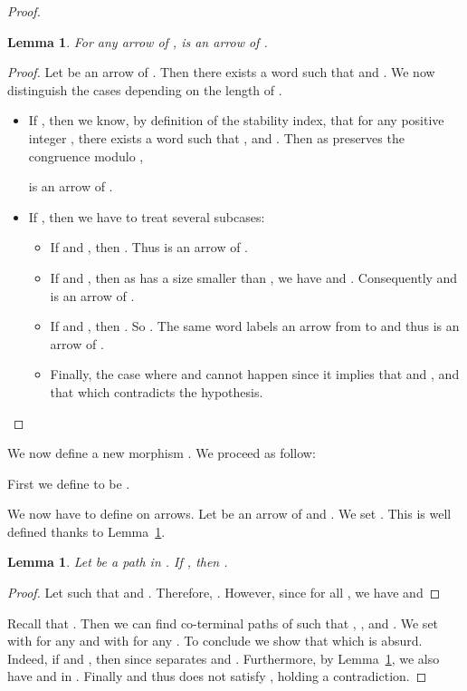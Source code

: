 \documentclass[submission,hidelink]{dmtcs-episciences}
\newtheorem{lemma}[theorem]{Lemma}
\newenvironment{itemize2}[1]{\begin{list}{--}{\setlength{\leftmargin}{0cm}}#1}{\end{list}}
\begin{document}
\begin{proof}
		\begin{lemma}\label{lemma:theta_arrow}
		For any arrow  of ,  is an arrow of .
		\end{lemma}
		\begin{proof}
		Let  be an arrow of . Then there exists a word  such that
		 and .
		We now distinguish the cases depending on the length of .
		\begin{itemize}
		\item If , then we know, by definition of the stability index, that for any positive integer , there exists a word  such that
		,  and .
		Then as  preserves the congruence modulo ,
		
		is an arrow of .
		\item If , then we have to treat several subcases:
			\begin{itemize}
				\item If  and , then .
				Thus  is an arrow of .
				\item If  and ,
		 then as  has a size smaller than , we have  and . Consequently  and
		  		 is an arrow of .
		  		\item If  and , then
		  		.
		  		So  .
		  		The same word  labels an arrow from  to  and thus
		  		 is an arrow of .
		  		\item Finally, the case where   and  cannot happen since
		  		it implies that  and , and that
		  		 which contradicts the  hypothesis.

			\end{itemize}
		\end{itemize}
		\end{proof}

		We now define a new morphism . We proceed as follow:
		\begin{itemize2}
				\item First we define  to be .
				\item We now have to define  on arrows.
				Let  be an arrow of  and .
				We set . This is well defined thanks
				to Lemma~\ref{lemma:theta_arrow}.
		\end{itemize2}
		\begin{lemma}\label{lemma:psi}
				Let  be a path in . If , then .
		\end{lemma}
		\begin{proof}
			Let  such that  and . Therefore,
			. However, since for all 
			, we have
			 and
			
		\end{proof}

		Recall that .
		Then we can find  co-terminal paths of  such that ,
		 , 
		and .
		 We set  with  for any  and
		 with  for any .
		To conclude we show that  which is absurd. Indeed, if 
		and , then  since  separates  and . Furthermore, by Lemma~\ref{lemma:psi},
		 we also have  and  in .
		 Finally  and thus  does not satisfy , holding a contradiction.

		\end{proof}
\end{document}
